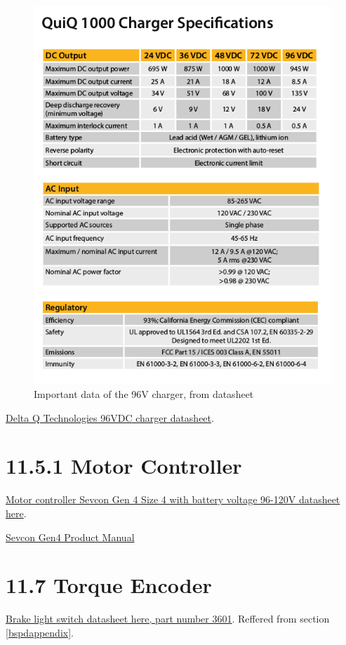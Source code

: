 \documentclass{article}
\begin{document}
{\begin{figure}[H]
    \centering
    \includegraphics[width = 0.8 \textwidth]{chargerdata}
    \caption{Important data of the 96V charger, from datasheet}
    \label{chargerdatasheet}
\end{figure}

\href{http://delta-q.com/wp-content/uploads/2015/12/Delta-Q_QuiQ1000_BatteryCharger_Specifications.pdf}{Delta Q Technologies 96VDC charger datasheet}.

\section*{11.5.1 Motor Controller}

\href{http://www.sevcon.com/media/2461/Gen4\%20Aug\%202013\%20web.pdf}{Motor controller Sevcon Gen 4 Size 4 with battery voltage 96-120V datasheet here}.

\href{http://www.thunderstruck-ev.com/Manuals/Gen4_Product_Manual_V3.0.pdf}{Sevcon Gen4 Product Manual}

\section*{11.7 Torque Encoder} \label{torqueappendix}

\href{https://www.pegasusautoracing.com/2015/086.pdf}{Brake light switch datasheet here, part number 3601}. Reffered from section \ref{bspdappendix}.

}
\end{document}
